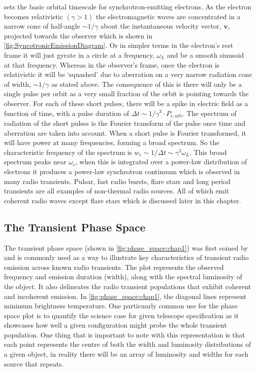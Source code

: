  sets the basic orbital timescale for synchrotron-emitting electrons. As the electron becomes relativistic $(\gamma>1)$ the electromagnetic waves are concentrated in a narrow cone of half-angle $\sim1/\gamma$ about the instantaneous velocity vector, $\textbf{v}$, projected towards the observer which is shown in \cref{fig:SyncotronicEmissionDiagram}.
Or in simpler terms in the electron's rest frame it will just gyrate in a circle at a frequency, $\omega_L$ and be a smooth sinusoid at that frequency. Whereas in the observer's frame, once the electron is relativistic it will be `squashed' due to aberration on a very narrow radiation cone of width, $\sim1/\gamma$ as stated above. The consequence of this is there will only be a single pulse per orbit as a very small fraction of the orbit is pointing towards the observer. For each of these short pulses, there will be a spike in electric field as a function of time, with a pulse duration of $\Delta t \sim 1/\gamma^3 \cdot P_{e,\text{orb}}$. The spectrum of radiation of the short pulses is the Fourier transform of the pulse once time and aberration are taken into account. When a short pulse is Fourier transformed, it will have power at many frequencies, forming a broad spectrum. So the characteristic frequency of the spectrum is $w_c \sim 1/\Delta t \sim \gamma^3 \omega_L$. This broad spectrum peaks near $\omega_c$, when this is integrated over a power-law distribution of electrons it produces a power-law synchrotron continuum which is observed in many radio transients. 
Pulsar, fast radio bursts, flare stars and long period transients are all examples of non-thermal radio sources. All of which emit coherent radio waves except flare stars which is discussed later in this chapter.

\subsection{The Transient Phase Space}

The transient phase space (shown in \cref{fig:phase_space:chap1}) was first coined by \cite{cordes_dynamic_2004} and is commonly used as a way to illustrate key characteristics of transient radio emission across known radio transients. The plot represents the observed frequency and emission duration (width),  along with the spectral luminosity of the object. It also delineates the radio transient populations that exhibit coherent and incoherent emission. In \cref{fig:phase_space:chap1}, the diagonal lines represent minimum brightness temperature. One particuarly common use for the phase space plot is to quantify the science case for given telescope specification as it showcases how well a given configuration might probe the whole transient population. One thing that is important to note with this representation is that each point represents the centre of both the width and luminosity distributions of a given object, in reality there will be an array of luminosity and widths for each source that repeats. 

